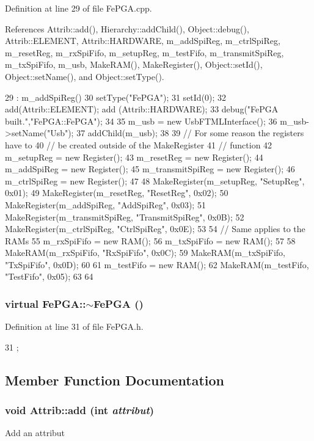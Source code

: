 Definition at line 29 of file FePGA.cpp.

References Attrib::add(), Hierarchy::addChild(), Object::debug(), Attrib::ELEMENT, Attrib::HARDWARE, m\_\-addSpiReg, m\_\-ctrlSpiReg, m\_\-resetReg, m\_\-rxSpiFifo, m\_\-setupReg, m\_\-testFifo, m\_\-transmitSpiReg, m\_\-txSpiFifo, m\_\-usb, MakeRAM(), MakeRegister(), Object::setId(), Object::setName(), and Object::setType().


\begin{DoxyCode}
29             : m_addSpiReg() {
30   setType("FePGA");
31   setId(0);
32   add(Attrib::ELEMENT); add (Attrib::HARDWARE);
33   debug("FePGA built.","FePGA::FePGA");
34 
35   m_usb = new UsbFTMLInterface();
36   m_usb->setName("Usb");
37   addChild(m_usb);
38 
39   // For some reason the registers have to
40   // be created outside of the MakeRegister
41   // function
42   m_setupReg       = new Register();
43   m_resetReg       = new Register();
44   m_addSpiReg      = new Register();
45   m_transmitSpiReg = new Register();
46   m_ctrlSpiReg     = new Register();
47 
48   MakeRegister(m_setupReg,       "SetupReg",       0x01);
49   MakeRegister(m_resetReg,       "ResetReg",       0x02);
50   MakeRegister(m_addSpiReg,      "AddSpiReg",      0x03);
51   MakeRegister(m_transmitSpiReg, "TransmitSpiReg", 0x0B);
52   MakeRegister(m_ctrlSpiReg,     "CtrlSpiReg",     0x0E);
53 
54   // Same applies to the RAMs
55   m_rxSpiFifo   = new RAM();
56   m_txSpiFifo   = new RAM();
57 
58   MakeRAM(m_rxSpiFifo, "RxSpiFifo", 0x0C);
59   MakeRAM(m_txSpiFifo, "TxSpiFifo", 0x0D);
60 
61   m_testFifo   = new RAM();
62   MakeRAM(m_testFifo, "TestFifo", 0x05);
63 
64 }
\end{DoxyCode}
\hypertarget{classFePGA_aa445095a44c521b6b7803feaef6c16ba}{
\subsubsection[{$\sim$FePGA}]{\setlength{\rightskip}{0pt plus 5cm}virtual FePGA::$\sim$FePGA ()}}
\label{classFePGA_aa445095a44c521b6b7803feaef6c16ba}


Definition at line 31 of file FePGA.h.


\begin{DoxyCode}
31 {}; 
\end{DoxyCode}


\subsection{Member Function Documentation}
\hypertarget{classAttrib_a235f773af19c900264a190b00a3b4ad7}{
\subsubsection[{add}]{\setlength{\rightskip}{0pt plus 5cm}void Attrib::add (int {\em attribut})}}
\label{classAttrib_a235f773af19c900264a190b00a3b4ad7}
Add an attribut 

